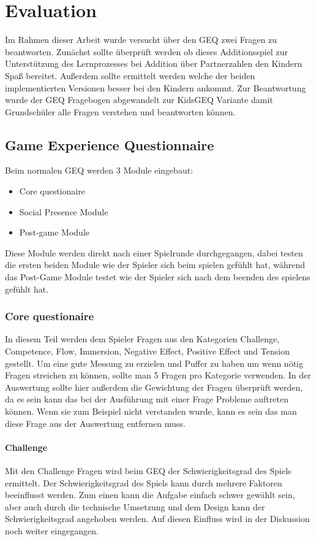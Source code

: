 \chapter{Evaluation} %
Im Rahmen dieser Arbeit wurde versucht über den GEQ zwei Fragen zu beantworten. Zunächst sollte überprüft werden ob dieses Additionsspiel zur Unterstützung des Lernprozesses bei Addition über Partnerzahlen den Kindern Spaß bereitet. Außerdem sollte ermittelt werden welche der beiden implementierten Versionen besser bei den Kindern ankommt. Zur Beantwortung wurde der GEQ Fragebogen abgewandelt zur KidsGEQ Variante damit Grundschüler alle Fragen verstehen und beantworten können.
\section{Game Experience Questionnaire}
Beim normalen GEQ werden 3 Module eingebaut:
\begin{itemize}
\item Core questionaire
\item Social Presence Module
\item Post-game Module
\end{itemize}
Diese Module werden direkt nach einer Spielrunde durchgegangen, dabei testen die ersten beiden Module wie der Spieler sich beim spielen gefühlt hat, während das Post-Game Module testet wie der Spieler sich nach dem beenden des spielens gefühlt hat.
\subsection{Core questionaire}
In diesem Teil werden dem Spieler Fragen aus den Kategorien Challenge, Competence, Flow, Immersion, Negative Effect, Positive Effect und Tension gestellt. Um eine gute Messung zu erzielen und Puffer zu haben um wenn nötig Fragen streichen zu können, sollte man 5 Fragen pro Kategorie verwenden. In der Auswertung sollte hier außerdem die Gewichtung der Fragen überprüft werden, da es sein kann das bei der Ausführung mit einer Frage Probleme auftreten können. Wenn sie zum Beispiel nicht verstanden wurde, kann es sein das man diese Frage aus der Auswertung entfernen muss.
\subsubsection{Challenge}
Mit den Challenge Fragen wird beim GEQ der Schwierigkeitsgrad des Spiels ermittelt. Der Schwierigkeitsgrad des Spiels kann durch mehrere Faktoren beeinflusst werden. Zum einen kann die Aufgabe einfach schwer gewählt sein, aber auch durch die technische Umsetzung und dem Design kann der Schwierigkeitsgrad angehoben werden. Auf diesen Einfluss wird in der Diskussion noch weiter eingegangen.
